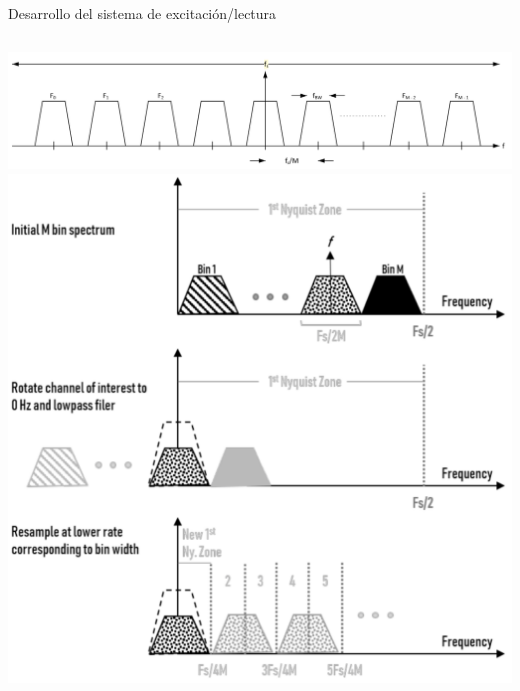 \documentclass[ignorenonframetext,12pt]{beamer}
\begin{document}
\begin{frame}{Desarrollo del sistema de excitación/lectura}
\begin{columns}
\begin{column}{0.6\textwidth}
				\begin{center}
								\includegraphics[width=\textwidth]{FDM_channel_diagram}
												\includegraphics[width=\textwidth]{pfb_basic1}
				\end{center}
								\end{column}
								\end{columns}
\end{frame}
\end{document}
